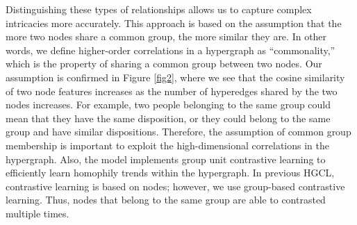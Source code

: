 Distinguishing these types of relationships allows us to capture complex intricacies more accurately. This approach is based on the assumption that the more two nodes share a common group, the more similar they are. In other words, we define higher-order correlations in a hypergraph as “commonality,” which is the property of sharing a common group between two nodes. Our assumption is confirmed in Figure \ref{fig2}, where we see that the cosine similarity of two node features increases as the number of hyperedges shared by the two nodes increases. For example, two people belonging to the same group could mean that they have the same disposition, or they could belong to the same group and have similar dispositions. Therefore, the assumption of common group membership is important to exploit the high-dimensional correlations in the hypergraph. Also, the model implements group unit contrastive learning to efficiently learn homophily trends within the hypergraph. In previous HGCL, contrastive learning is based on nodes; however, we use group-based contrastive learning. Thus, nodes that belong to the same group are able to contrasted multiple times. 



